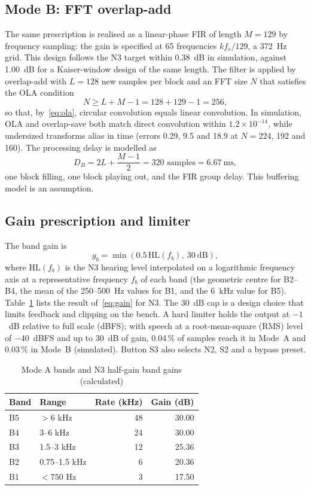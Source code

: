 \documentclass[conference]{IEEEtran}
\begin{document}
\subsection{Mode B: FFT overlap-add}
The same prescription is realised as a linear-phase FIR of length $M=129$ by frequency sampling: the gain is specified at 65 frequencies $k f_s/129$, a 372~Hz grid. This design follows the N3 target within 0.38~dB in simulation, against 1.00~dB for a Kaiser-window design of the same length. The filter is applied by overlap-add with $L=128$ new samples per block and an FFT size $N$ that satisfies the OLA condition
\begin{equation}
N \ge L+M-1 = 128+129-1 = 256, \label{eq:ola}
\end{equation}
so that, by~\eqref{eq:ola}, circular convolution equals linear convolution. In simulation, OLA and overlap-save both match direct convolution within $1.2\times10^{-14}$, while undersized transforms alias in time (errors 0.29, 9.5 and 18.9 at $N=224$, 192 and 160). The processing delay is modelled as
\begin{equation}
D_B = 2L+\frac{M-1}{2} = 320 \text{ samples} = 6.67\ \text{ms}, \label{eq:delayB}
\end{equation}
one block filling, one block playing out, and the FIR group delay. This buffering model is an assumption.

\subsection{Gain prescription and limiter}
The band gain is
\begin{equation}
g_b = \min\!\left(0.5\,\mathrm{HL}(f_b),\ 30\ \mathrm{dB}\right), \label{eq:gain}
\end{equation}
where $\mathrm{HL}(f_b)$ is the N3 hearing level interpolated on a logarithmic frequency axis at a representative frequency $f_b$ of each band (the geometric centre for B2--B4, the mean of the 250--500~Hz values for B1, and the 6~kHz value for B5). Table~\ref{tab:gains} lists the result of~\eqref{eq:gain} for N3. The 30~dB cap is a design choice that limits feedback and clipping on the bench. A hard limiter holds the output at $-1$~dB relative to full scale (dBFS); with speech at a root-mean-square (RMS) level of $-40$~dBFS and up to 30~dB of gain, 0.04\,\% of samples reach it in Mode~A and 0.03\,\% in Mode~B (simulated). Button S3 also selects N2, S2 and a bypass preset.

\begin{table}[t]
\centering
\caption{Mode A bands and N3 half-gain band gains (calculated)}
\label{tab:gains}
\begin{tabular}{@{}llrr@{}}
\toprule
Band & Range & Rate (kHz) & Gain (dB) \\
\midrule
B5 & $>6$ kHz & 48 & 30.00 \\
B4 & 3--6 kHz & 24 & 30.00 \\
B3 & 1.5--3 kHz & 12 & 25.36 \\
B2 & 0.75--1.5 kHz & 6 & 20.36 \\
B1 & $<750$ Hz & 3 & 17.50 \\
\bottomrule
\end{tabular}
\end{table}
\end{document}
